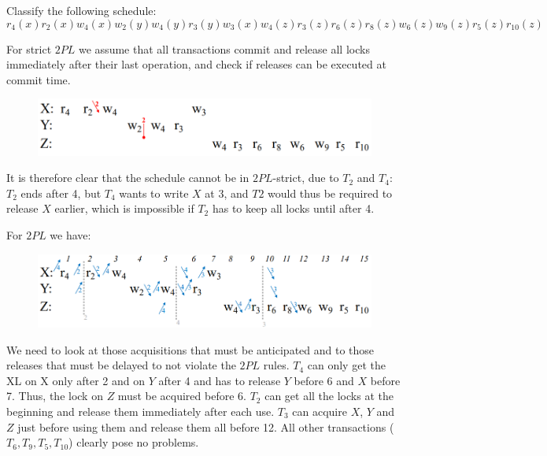 \documentclass[12pt, a4paper]{report}
\newtheorem[style=M,bodystyle=\normalfont]{theorem}{Theorem}
\newtheorem[style=M,bodystyle=\normalfont]{corollary}{Corollary}
\newtheorem[style=M,bodystyle=\normalfont]{lemma}{Lemma}
\newtheorem[style=M,bodystyle=\normalfont]{definition}{Definition}
\begin{document}
    \newpage

    \begin{Exercise}[label=1]
        Classify the following schedule: 
        \[r_4(x) r_2(x) w_4(x) w_2(y) w_4(y) r_3(y) w_3(x) w_4(z) r_3(z) r_6(z) r_8(z) w_6(z) w_9(z) r_5(z) r_10(z)\]
    \end{Exercise}
    \begin{Answer}[ref=1]
        For strict $2PL$ we assume that all transactions commit and release all locks immediately after their last operation, and check if releases can be executed at commit time.
        \begin{figure}[H]
            \centering
            \includegraphics[width=1\linewidth]{images/2PL3.png}
        \end{figure}
        It is therefore clear that the schedule cannot be in $2PL$-strict, due to $T_2$ and $T_4$: $T_2$ ends after 4, but $T_4$ wants to write $X$ at 3, and $T2$ would thus be 
        required to release $X$ earlier, which is impossible if $T_2$ has to keep all locks until after 4.

        For $2PL$ we have: 
        \begin{figure}[H]
            \centering
            \includegraphics[width=1\linewidth]{images/2PL4.png}
        \end{figure}
        We need to look at those acquisitions that must be anticipated and to those releases that must be delayed to not violate the $2PL$ rules.
        $T_4$ can only get the XL on X only after 2 and on $Y$ after 4 and has to release $Y$ before 6 and $X$ before 7. Thus, the lock on $Z$ must be acquired before 6.
        $T_2$ can get all the locks at the beginning and release them immediately after each use. $T_3$ can acquire $X$, $Y$ and $Z$ just before using them and release them all before 12. 
        All other transactions ($T_6, T_9, T_5, T_10$) clearly pose no problems.
    \end{Answer}
\end{document}
